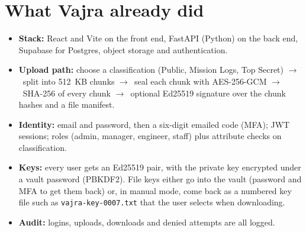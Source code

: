 \documentclass[10pt,a4paper]{article}
\newcommand{\code}[1]{\texttt{#1}}
\newcommand{\go}{\ensuremath{\rightarrow}}
\begin{document}
\section{What Vajra already did}
\begin{itemize}
  \item \textbf{Stack:} React and Vite on the front end, FastAPI (Python) on the back end, Supabase for Postgres,
        object storage and authentication.
  \item \textbf{Upload path:} choose a classification (Public, Mission Logs, Top Secret) \go\ split into 512~KB chunks
        \go\ seal each chunk with AES-256-GCM \go\ SHA-256 of every chunk \go\ optional Ed25519 signature over the chunk
        hashes and a file manifest.
  \item \textbf{Identity:} email and password, then a six-digit emailed code (MFA); JWT sessions; roles (admin, manager,
        engineer, staff) plus attribute checks on classification.
  \item \textbf{Keys:} every user gets an Ed25519 pair, with the private key encrypted under a vault password (PBKDF2).
        File keys either go into the vault (password and MFA to get them back) or, in manual mode, come back as a numbered
        key file such as \code{vajra-key-0007.txt} that the user selects when downloading.
  \item \textbf{Audit:} logins, uploads, downloads and denied attempts are all logged.
\end{itemize}
\end{document}
